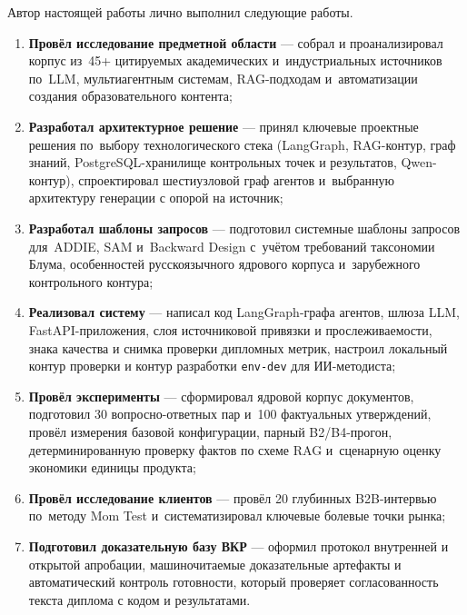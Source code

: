 Автор настоящей работы лично выполнил следующие работы.

\begin{enumerate}
  \item \textbf{Провёл исследование предметной области} — собрал и
    проанализировал корпус из~45+ цитируемых академических
    и~индустриальных источников по~LLM, мультиагентным системам,
    RAG-подходам и~автоматизации создания образовательного контента;

  \item \textbf{Разработал архитектурное решение} — принял ключевые
    проектные решения по~выбору технологического стека (LangGraph,
    RAG-контур, граф знаний, PostgreSQL-хранилище контрольных точек
    и результатов, Qwen-контур), спроектировал шестиузловой граф агентов
    и~выбранную архитектуру генерации с опорой на источник;

  \item \textbf{Разработал шаблоны запросов} — подготовил системные
    шаблоны запросов для~ADDIE, SAM и~Backward Design с~учётом
    требований таксономии Блума, особенностей русскоязычного
    ядрового корпуса и~зарубежного контрольного контура;

  \item \textbf{Реализовал систему} — написал код LangGraph-графа агентов,
    шлюза LLM, FastAPI-приложения, слоя источниковой привязки
    и прослеживаемости, знака качества и снимка проверки дипломных метрик, настроил локальный
    контур проверки и контур разработки \texttt{env-dev} для ИИ-методиста;

  \item \textbf{Провёл эксперименты} — сформировал ядровой корпус
    документов, подготовил 30 вопросно-ответных пар и~100 фактуальных утверждений,
    провёл измерения базовой конфигурации, парный B2/B4-прогон,
    детерминированную проверку фактов по схеме RAG и~сценарную
    оценку экономики единицы продукта;

  \item \textbf{Провёл исследование клиентов} — провёл 20 глубинных B2B-интервью
    по~методу Mom Test и~систематизировал ключевые болевые точки рынка;

  \item \textbf{Подготовил доказательную базу ВКР} — оформил
    протокол внутренней и открытой апробации, машиночитаемые
    доказательные артефакты и автоматический контроль готовности, который
    проверяет согласованность текста диплома с кодом и результатами.
\end{enumerate}

